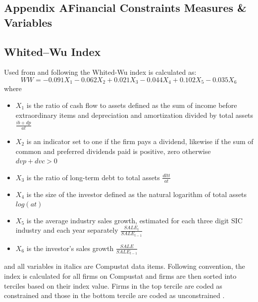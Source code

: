 \documentclass[12pt]{article}
\begin{document}
\cleardoublepage	
\begin{appendices}
\renewcommand{\appendixname}{Appendix}

\section*{Appendix A\indent Financial Constraints Measures \& Variables}
  
	\subsection*{Whited--Wu Index}
	\noindent Used from \citet[p.543]{Whited2006} and following \citet[p.305]{Farre-Mensa2016} the Whited-Wu index is calculated as:
		\begin{equation*}
		WW=-0.091X_{1}-0.062X_{2}+0.021X_{3}-0.044X_{4}+0.102X_{5}-0.035X_{6}
		\end{equation*}
	where
	\begin{itemize}
	\renewcommand\labelitemi{}
		\item $X_{1}$ is the ratio of cash flow to assets defined as the sum of income before extraordinary items and depreciation and amortization divided by total assets $\frac{ib+dp}{at}$
		\item $X_{2}$ is an indicator set to one if the firm pays a dividend, likewise if the sum of common and preferred dividends paid is positive, zero otherwise $dvp+dvc>0$
		\item $X_{3}$ is the ratio of long-term debt to total assets $\frac{dltt}{at}$
		\item $X_{4}$ is the size of the investor defined as the natural logarithm of total assets $log(at)$
		\item $X_{5}$ is the average industry sales growth, estimated for each three digit SIC industry and each year separately $\frac{SALE_{t}}{SALE_{t-1}}$
		\item $X_{6}$ is the investor's sales growth $\frac{SALE}{SALE_{t-1}}$
	\end{itemize}

	\noindent and all variables in italics are Compustat data items. Following convention, the index is calculated for all firms on Compustat and firms are then sorted into terciles based on their index value. Firms in the top tercile are coded as constrained and those in the bottom tercile are coded as unconstrained \citep[p.306]{Farre-Mensa2016}. 


\end{appendices}
\end{document}
